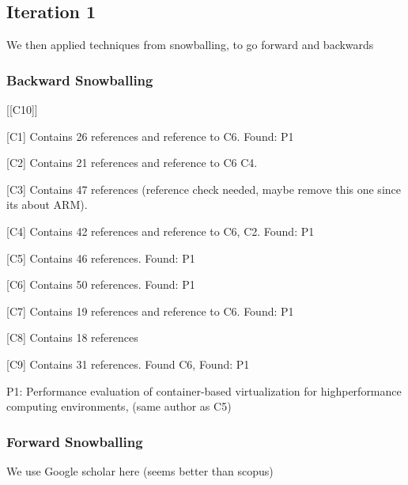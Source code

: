 \subsection{Iteration 1}

We then applied techniques from snowballing, to go forward and backwards 

\subsubsection{Backward Snowballing}
\begin{labeling}{[{[}C10{]}]}
\item [{[}C1{]}]  	Contains 26 references and reference to C6. Found: P1
\item [{[}C2{]}]  	Contains 21 references and reference to C6 C4.
\item [{[}C3{]}]    Contains 47 references (reference check needed, maybe remove this one since its about ARM).
\item [{[}C4{]}]  	Contains 42 references and reference to C6, C2. Found: P1
\item [{[}C5{]}]  	Contains 46 references. Found: P1
\item [{[}C6{]}]  	Contains 50 references. Found: P1
\item [{[}C7{]}]  	Contains 19 references and reference to C6. Found: P1
\item [{[}C8{]}]  	Contains 18 references
\item [{[}C9{]}]  	Contains 31 references. Found C6, Found: P1
\end{labeling}

P1: Performance evaluation of container-based virtualization for highperformance computing environments, (same author as C5)

\subsubsection{Forward Snowballing}
We use Google scholar here (seems better than scopus) 


